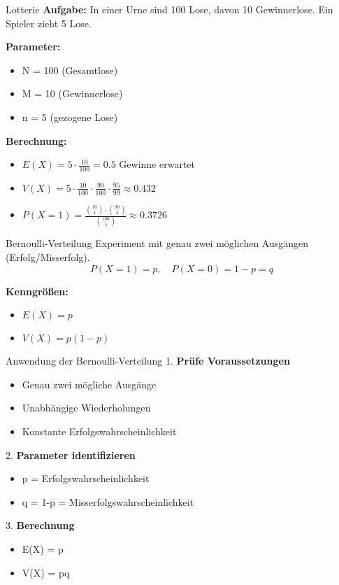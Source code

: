\begin{example2}{Lotterie}
\textbf{Aufgabe:} In einer Urne sind 100 Lose, davon 10 Gewinnerlose. Ein Spieler zieht 5 Lose.

\textbf{Parameter:}
\begin{itemize}
\item N = 100 (Gesamtlose)
\item M = 10 (Gewinnerlose)
\item n = 5 (gezogene Lose)
\end{itemize}

\textbf{Berechnung:}
\begin{itemize}
\item $E(X) = 5 \cdot \frac{10}{100} = 0.5$ Gewinne erwartet
\item $V(X) = 5 \cdot \frac{10}{100} \cdot \frac{90}{100} \cdot \frac{95}{99} \approx 0.432$
\item $P(X=1) = \frac{\binom{10}{1} \cdot \binom{90}{4}}{\binom{100}{5}} \approx 0.3726$
\end{itemize}
\end{example2}

\begin{definition}{Bernoulli-Verteilung}
Experiment mit genau zwei möglichen Ausgängen (Erfolg/Misserfolg).
$$P(X=1) = p, \quad P(X=0) = 1-p = q$$

\textbf{Kenngrößen:}
\begin{itemize}
    \item $E(X) = p$
    \item $V(X) = p(1-p)$
\end{itemize}
\end{definition}

\begin{KR}{Anwendung der Bernoulli-Verteilung}
1. \textbf{Prüfe Voraussetzungen}
   \begin{itemize}
   \item Genau zwei mögliche Ausgänge
   \item Unabhängige Wiederholungen
   \item Konstante Erfolgswahrscheinlichkeit
   \end{itemize}

2. \textbf{Parameter identifizieren}
   \begin{itemize}
   \item p = Erfolgswahrscheinlichkeit
   \item q = 1-p = Misserfolgswahrscheinlichkeit
   \end{itemize}

3. \textbf{Berechnung}
   \begin{itemize}
   \item E(X) = p
   \item V(X) = pq
   \end{itemize}
\end{KR}


